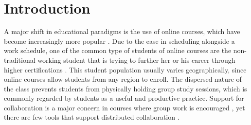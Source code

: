 \documentclass{sig-alternate}
\begin{document}




%
%
%
%
%
%
%


\section{Introduction}
A major shift in educational paradigms is the use of online courses,
which have become increasingly more popular \cite{BELLER,DOE}.  Due to
the ease in scheduling alongside a work schedule, one of the common
type of students of online courses are the non-traditional working
student that is trying to further her or his career through higher
certifications \cite{BURGESS}.  This student population usually
varies geographically, since online courses allow students from any
region to enroll.  The dispersed nature of the class prevents students
from physically holding group study sessions, which is commonly
regarded by students as a useful and productive practice.  Support for
collaboration is a major concern in courses where group work is
encouraged \cite{WELLS}, yet there are few tools that support
distributed collaboration \cite{BURGESS}.
\end{document}

